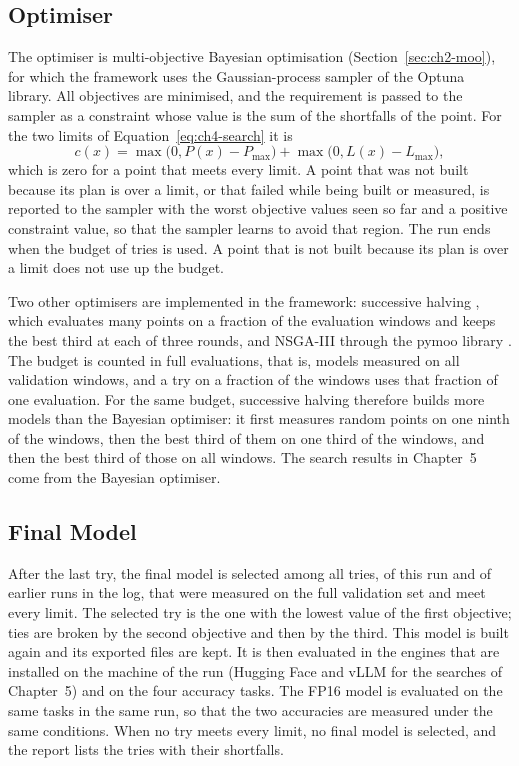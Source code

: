 \documentclass[
11pt, %
english, %
singlespacing, %
headsepline, %
]{MastersDoctoralThesis} %
\begin{document}
\subsection{Optimiser}
\label{sec:ch4-optimiser}

The optimiser is multi-objective Bayesian optimisation (Section~\ref{sec:ch2-moo}), for which the framework uses the Gaussian-process sampler of the Optuna library. All objectives are minimised, and the requirement is passed to the sampler as a constraint whose value is the sum of the shortfalls of the point. For the two limits of Equation~\ref{eq:ch4-search} it is
\begin{equation}
  c(x) = \max\bigl(0, P(x) - P_{\max}\bigr) + \max\bigl(0, L(x) - L_{\max}\bigr),
  \label{eq:ch4-constraint}
\end{equation}
which is zero for a point that meets every limit. A point that was not built because its plan is over a limit, or that failed while being built or measured, is reported to the sampler with the worst objective values seen so far and a positive constraint value, so that the sampler learns to avoid that region. The run ends when the budget of tries is used. A point that is not built because its plan is over a limit does not use up the budget.

Two other optimisers are implemented in the framework: successive halving \cite{bischl2021hpo}, which evaluates many points on a fraction of the evaluation windows and keeps the best third at each of three rounds, and NSGA-III through the pymoo library \cite{blank2020pymoo}. The budget is counted in full evaluations, that is, models measured on all validation windows, and a try on a fraction of the windows uses that fraction of one evaluation. For the same budget, successive halving therefore builds more models than the Bayesian optimiser: it first measures random points on one ninth of the windows, then the best third of them on one third of the windows, and then the best third of those on all windows. The search results in Chapter~5 come from the Bayesian optimiser.

\subsection{Final Model}
\label{sec:ch4-final}

After the last try, the final model is selected among all tries, of this run and of earlier runs in the log, that were measured on the full validation set and meet every limit. The selected try is the one with the lowest value of the first objective; ties are broken by the second objective and then by the third. This model is built again and its exported files are kept. It is then evaluated in the engines that are installed on the machine of the run (Hugging Face and vLLM for the searches of Chapter~5) and on the four accuracy tasks. The FP16 model is evaluated on the same tasks in the same run, so that the two accuracies are measured under the same conditions. When no try meets every limit, no final model is selected, and the report lists the tries with their shortfalls.
\end{document}
